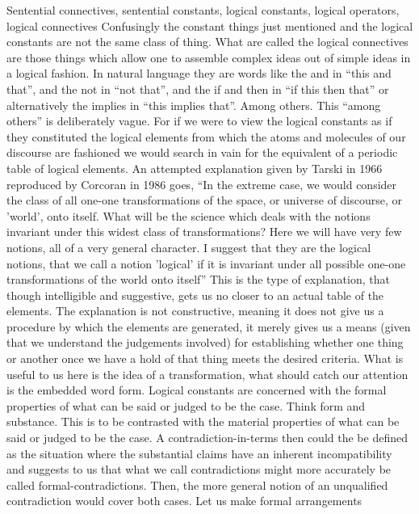 \documentclass[dah,phd,a4paper]{xe_uccthesis}
\begin{document}
Sentential connectives, sentential constants, logical constants, logical operators, logical connectives
Confusingly the constant things just mentioned and the logical constants are not the same class of thing. What are called the logical connectives are those things which allow one to assemble complex ideas out of simple ideas in a logical fashion. In natural language they are words like the and in “this and that”, and the not in “not that”, and the if and then in “if this then that” or alternatively the implies in “this implies that”. Among others. This “among others” is deliberately vague. For if we were to view the logical constants as if they constituted the logical elements from which the atoms and molecules of our discourse are fashioned we would search in vain for the equivalent of a periodic table of logical elements.
An attempted explanation given by Tarski in 1966 reproduced by Corcoran in 1986 goes,
“In the extreme case, we would consider the class of all one-one transformations of the space, or universe of discourse, or 'world', onto itself. What will be the science which deals with the notions invariant under this widest class of transformations? Here we will have very few notions, all of a very general character. I suggest that they are the logical notions, that we call a notion 'logical' if it is invariant under all possible one-one transformations of the world onto itself”
This is the type of explanation, that though intelligible and suggestive, gets us no closer to an actual table of the elements. The explanation is not constructive, meaning it does not give us a procedure by which the elements are generated, it merely gives us a means (given that we understand the judgements involved) for establishing whether one thing or another once we have a hold of that thing meets the desired criteria.
What is useful to us here is the idea of a transformation, what should catch our attention is the embedded word form. Logical constants are concerned with the formal properties of what can be said or judged to be the case. Think form and substance. This is to be contrasted with the material properties of what can be said or judged to be the case. A contradiction-in-terms then could the be defined as the situation where the substantial claims have an inherent incompatibility and suggests to us that what we call contradictions might more accurately be called formal-contradictions. Then, the more general notion of an unqualified contradiction would cover both cases.
Let us make formal arrangements
\end{document}
